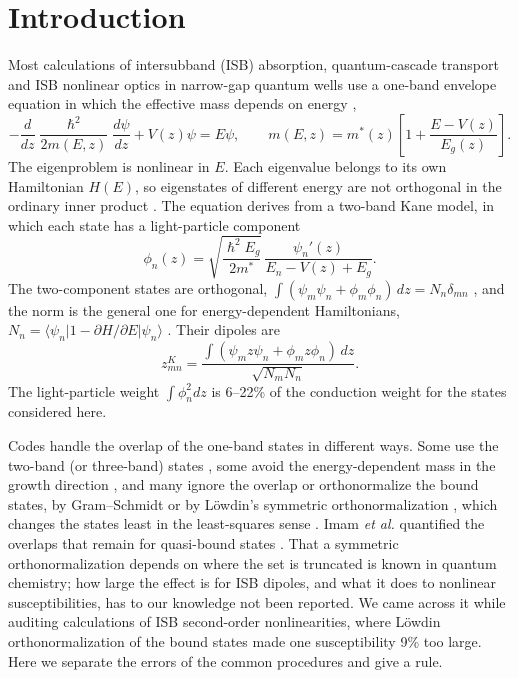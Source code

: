 \documentclass[11pt]{article}
\begin{document}
\section{Introduction}
Most calculations of intersubband (ISB) absorption, quantum-cascade transport and ISB nonlinear optics in narrow-gap quantum wells use a one-band envelope equation in which the effective mass depends on energy \cite{Nelson1987,Ekenberg1989,Sirtori1994,JirauschekKubis2014},
\begin{equation}
-\frac{d}{dz}\frac{\hslash^2}{2m(E,z)}\frac{d\psi}{dz}+V(z)\psi=E\psi,\qquad m(E,z)=m^*(z)\left[1+\frac{E-V(z)}{E_g(z)}\right].
\label{eq:H}
\end{equation}
The eigenproblem is nonlinear in $E$. Each eigenvalue belongs to its own Hamiltonian $H(E)$, so eigenstates of different energy are not orthogonal in the ordinary inner product \cite{JirauschekKubis2014,Jonasson2016,Mohamed2024}. The equation derives from a two-band Kane model, in which each state has a light-particle component
\begin{equation}
\phi_n(z)=\sqrt{\frac{\hslash^2E_g}{2m^*}}\,\frac{\psi_n'(z)}{E_n-V(z)+E_g}.
\label{eq:phi}
\end{equation}
The two-component states are orthogonal, $\int(\psi_m\psi_n+\phi_m\phi_n)\,dz=N_n\delta_{mn}$ \cite{Sirtori1994,Mohamed2024}, and the norm is the general one for energy-dependent Hamiltonians, $N_n=\langle\psi_n|1-\partial H/\partial E|\psi_n\rangle$ \cite{Formanek2004}. Their dipoles are
\begin{equation}
z^K_{mn}=\frac{\int(\psi_m z\psi_n+\phi_m z\phi_n)\,dz}{\sqrt{N_mN_n}} .
\label{eq:zK}
\end{equation}
The light-particle weight $\int\phi_n^2dz$ is 6--22\% of the conduction weight for the states considered here.

Codes handle the overlap of the one-band states in different ways. Some use the two-band (or three-band) states \cite{Mohamed2024}, some avoid the energy-dependent mass in the growth direction \cite{Jonasson2016}, and many ignore the overlap or orthonormalize the bound states, by Gram--Schmidt or by L\"owdin's symmetric orthonormalization \cite{Lowdin1950}, which changes the states least in the least-squares sense \cite{CarlsonKeller1957}. Imam \emph{et al.} quantified the overlaps that remain for quasi-bound states \cite{Imam2000}. That a symmetric orthonormalization depends on where the set is truncated is known in quantum chemistry; how large the effect is for ISB dipoles, and what it does to nonlinear susceptibilities, has to our knowledge not been reported. We came across it while auditing calculations of ISB second-order nonlinearities, where L\"owdin orthonormalization of the bound states made one susceptibility 9\% too large. Here we separate the errors of the common procedures and give a rule.
\end{document}

